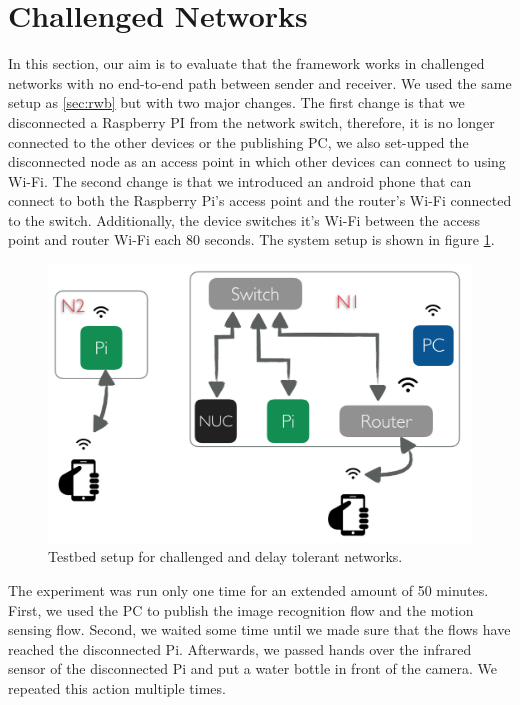 \section{Challenged Networks}
In this section, our aim is to evaluate that the framework works in challenged networks with no end-to-end path between  sender and receiver. We used the same setup as \ref{sec:rwb} but with two major changes. The first change is that we disconnected  a Raspberry PI from the network switch, therefore, it is no longer connected to the other devices or the publishing PC, we also set-upped the disconnected node as an access point in which other devices can connect to using Wi-Fi. The second change is that we introduced an android phone that can connect to both the Raspberry Pi's access point and the router's Wi-Fi connected to the switch. Additionally, the device switches it's Wi-Fi between the access point and router Wi-Fi each 80 seconds. The system setup is shown in figure \ref{fig:tb-dtn}.
\begin{figure}[H]
	\centering
	\includegraphics[scale=0.6]{images/tb-dtn.png}
	\caption{Testbed setup for challenged and delay tolerant networks.}
	\label{fig:tb-dtn}
\end{figure} 

\noindent The experiment was run only one time for an extended amount of 50 minutes. First, we used the PC to publish the image recognition flow and the motion sensing flow. Second, we waited some time until we made sure that the flows have reached the disconnected Pi. Afterwards, we passed hands over the infrared sensor of the disconnected Pi and put a water bottle in front of the camera. We repeated this action multiple times.\\

